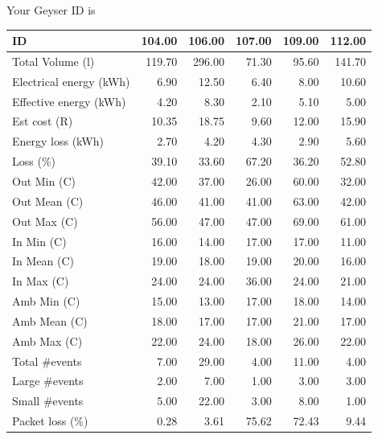 \documentclass{article}\usepackage[]{graphicx}\usepackage[]{color}
\newenvironment{knitrout}{}{} %
\begin{document}
Your Geyser ID is  \\




\begin{center}
\begin{knitrout}
\color{fgcolor}
\begin{tabular}{l|r|r|r|r|r}
\hline
ID & 104.00 & 106.00 & 107.00 & 109.00 & 112.00\\
\hline
Total Volume (l) & 119.70 & 296.00 & 71.30 & 95.60 & 141.70\\
\hline
Electrical energy (kWh) & 6.90 & 12.50 & 6.40 & 8.00 & 10.60\\
\hline
Effective energy (kWh) & 4.20 & 8.30 & 2.10 & 5.10 & 5.00\\
\hline
Est cost (R) & 10.35 & 18.75 & 9.60 & 12.00 & 15.90\\
\hline
Energy loss (kWh) & 2.70 & 4.20 & 4.30 & 2.90 & 5.60\\
\hline
Loss (\%) & 39.10 & 33.60 & 67.20 & 36.20 & 52.80\\
\hline
Out Min (C) & 42.00 & 37.00 & 26.00 & 60.00 & 32.00\\
\hline
Out Mean (C) & 46.00 & 41.00 & 41.00 & 63.00 & 42.00\\
\hline
Out Max (C) & 56.00 & 47.00 & 47.00 & 69.00 & 61.00\\
\hline
In Min (C) & 16.00 & 14.00 & 17.00 & 17.00 & 11.00\\
\hline
In Mean (C) & 19.00 & 18.00 & 19.00 & 20.00 & 16.00\\
\hline
In Max (C) & 24.00 & 24.00 & 36.00 & 24.00 & 21.00\\
\hline
Amb Min (C) & 15.00 & 13.00 & 17.00 & 18.00 & 14.00\\
\hline
Amb Mean (C) & 18.00 & 17.00 & 17.00 & 21.00 & 17.00\\
\hline
Amb Max (C) & 22.00 & 24.00 & 18.00 & 26.00 & 22.00\\
\hline
Total \#events & 7.00 & 29.00 & 4.00 & 11.00 & 4.00\\
\hline
Large \#events & 2.00 & 7.00 & 1.00 & 3.00 & 3.00\\
\hline
Small \#events & 5.00 & 22.00 & 3.00 & 8.00 & 1.00\\
\hline
Packet loss (\%) & 0.28 & 3.61 & 75.62 & 72.43 & 9.44\\
\hline
\end{tabular}


\end{knitrout}
\end{center}
\end{document}
